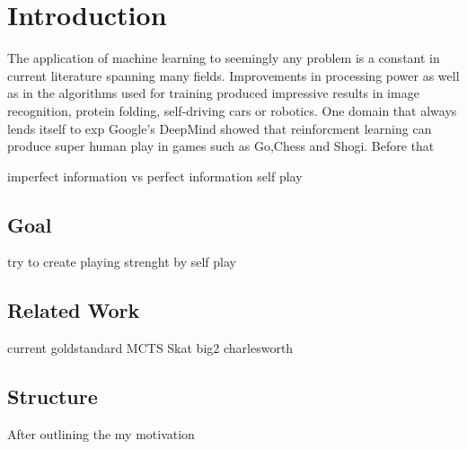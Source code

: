\chapter{Introduction}
The application of machine learning to seemingly any problem is a constant in current literature spanning many
fields.
Improvements in processing power as well as in the algorithms used for training produced impressive results in image
recognition, protein folding, self-driving cars or robotics.
One domain that always lends itself to exp
Google's DeepMind showed that reinforcment learning can produce super human play in games such as Go,Chess and Shogi.
Before that

imperfect information vs perfect information
self play


\section{Goal}
try to create playing strenght by self play


\section{Related Work}
current goldstandard MCTS
Skat
big2
charlesworth


\section{Structure}
After outlining the my motivation